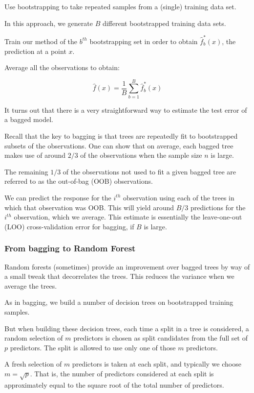 Use bootstrapping to take repeated samples from a (single) training data set.

In this approach, we generate $B$ different bootstrapped training data sets.

Train our method of the $b^{th}$  bootstrapping set in order to obtain $\hat{f}_b^*(x)$, the prediction at a point $x$.

Average all the observations to obtain:

\[
\hat{f}(x) = \frac{1}{B}\sum_{b=1}^B \hat{f}_b^*(x)
\]

It turns out that there is a very straightforward way to estimate the test error of a bagged model.

Recall that the key to bagging is that trees are repeatedly fit to bootstrapped subsets of the observations. One can show that on average, each bagged tree makes use of around $2/3$ of the observations when the sample size 
$n$ is large.

The remaining $1/3$ of the observations not used to fit a given bagged tree are referred to as the out-of-bag (OOB) observations.

We can predict the response for the $i^{th}$ observation using each of the trees in which that observation was OOB. This will yield around $B/3$ predictions for the $i^{th}$ observation, which we average. This estimate is essentially the leave-one-out (LOO) cross-validation error for bagging, if $B$ is large.

\subsubsection{From bagging to Random Forest}

\indent

Random forests (sometimes) provide an improvement over bagged trees by way of a small tweak that decorrelates the trees. This reduces the variance when we average the trees.

As in bagging, we build a number of decision trees on bootstrapped training samples.

But when building these decision trees, each time a split in a tree is considered, a random selection of $m$ predictors is chosen as split candidates from the full set of $p$ predictors. The split is allowed to use only one of those $m$ predictors.

A fresh selection of $m$ predictors is taken at each split, and typically we choose $m = \sqrt{p}$. That is, the number of predictors considered at each split is approximately equal to the square root of the total number of predictors.

